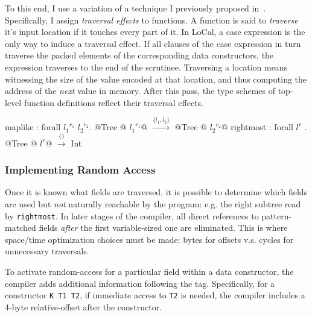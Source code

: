 \documentclass[showabstract,showacknowledgments,showpreface,showdedication,school]{iuphd}
\makeatletter
\theoremstyle{nonumberplain}
\newcommand{\sysname}[0]{LoCal\xspace}
\newcommand{\ourcalc}[0]{\sysname}
\newcommand{\locreg}[2]{\ensuremath{{#1}^{#2}}}
\newcommand{\tyatlocreg}[3]{#1 \ensuremath{@} \locreg{#2}{#3}}
\newcommand{\il}[1]{\lstinline[style=inline,mathescape=true];#1;}
\makeatother
\begin{document}
To this end, I use a variation of a technique I previously proposed
in~\cite{ecoop17-gibbon}. Specifically, I assign \emph{traversal effects} to
functions. A function is said to \emph{traverse} it's input location if it
touches every part of it. In \ourcalc{}, a case expression is the only way to
induce a traversal effect. If all clauses of the case expression in turn
traverse the packed elements of the corresponding data constructors, the
expression traverses to the end of the scrutinee.
Traversing a location means witnessing the size of the value encoded at that
location, and thus computing the address of the \emph{next} value in memory.
After this pass, the type schemes of top-level function definitions reflect
their traversal effects.


\begin{code}
maplike : forall $\locreg{l_1}{r_1}$ $\locreg{l_2}{r_2}$. @\tyatlocreg{Tree}{l_1}{r_1}@ $\xrightarrow{\{ l_1, l_2 \}}$ @\tyatlocreg{Tree}{l_2}{r_2}@
rightmost : forall $\locreg{l}{r}$ . @\tyatlocreg{Tree}{l}{r}@ $\xrightarrow{\{\}}$ Int
\end{code}

\subsubsection{Implementing Random Access}
\label{sec:rand-access}

Once it is known what fields are traversed, it is possible to determine which fields are
used but \emph{not} naturally reachable by the program: e.g. the right subtree
read by \il{rightmost}.
In later stages of the compiler, all direct references to
pattern-matched fields {\em after} the first variable-sized one are eliminated.
This is where space/time optimization choices must be made:
bytes for offsets v.s. cycles for unnecessary traversals.




To activate random-access for a particular field within a data constructor, the compiler
adds additional information following the tag.  Specifically, for a constructor
\il{K T1 T2}, if immediate access to \il{T2} is needed, the compiler includes a 4-byte
relative-offset after the constructor.
\end{document}

